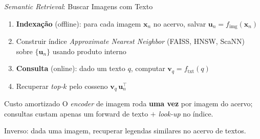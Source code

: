 \documentclass[aspectratio=169,xcolor=dvipsnames]{beamer}
\begin{document}
  \begin{frame}{\textit{Semantic Retrieval}: Buscar Imagens com Texto}
    \begin{enumerate}
      \item \textbf{Indexação} (offline): para cada imagem $\mathbf{x}_n$ no acervo, salvar $\mathbf{u}_n = f_{\text{img}}(\mathbf{x}_n)$
      \item Construir índice \textit{Approximate Nearest Neighbor} (FAISS, HNSW, ScaNN) sobre $\{\mathbf{u}_n\}$ usando produto interno
      \item \textbf{Consulta} (online): dado um texto $q$, computar $\mathbf{v}_q = f_{\text{txt}}(q)$
      \item Recuperar \textit{top-}$k$ pelo cosseno $\mathbf{v}_q\,\mathbf{u}_n^{\top}$
    \end{enumerate}

    \vspace{0.4em}
    \begin{block}{Custo amortizado}
      O \textit{encoder} de imagem roda \textbf{uma vez} por imagem do acervo;
      consultas custam apenas um forward de texto $+$ \textit{look-up} no índice.
    \end{block}

    \vspace{0.2em}
    Inverso: dada uma imagem, recuperar legendas similares no acervo de textos.
  \end{frame}
\end{document}
